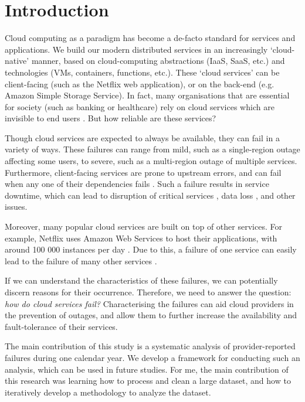 \section{Introduction}
Cloud computing as a paradigm has become a de-facto standard for services and applications.
We build our modern distributed services in an increasingly `cloud-native' manner, based on cloud-computing abstractions (IaaS, SaaS, etc.) and technologies (VMs, containers, functions, etc.).
These `cloud services' can be client-facing (such as the Netflix web application), or on the back-end (e.g. Amazon Simple Storage Service).
In fact, many organisations that are essential for society (such as banking or healthcare) rely on cloud services which are invisible to end users \cite{armbrust2010,dean2015}.
But how reliable are these services?

Though cloud services are expected to always be available, they can fail in a variety of ways.
These failures can range from mild, such as a single-region outage affecting some users, to severe, such as a multi-region outage of multiple services.
Furthermore, client-facing services are prone to upstream errors, and can fail when any one of their dependencies fails \cite{steen2016}.
Such a failure results in service downtime, which can lead to disruption of critical services \cite{emergencyOnCloud,healthcareCrash}, data loss \cite{tencentDataLoss}, and other issues.

Moreover, many popular cloud services are built on top of other services.
For example, Netflix uses Amazon Web Services to host their applications, with around 100 000 instances per day \cite{awsNetflixStudy}.
Due to this, a failure of one service can easily lead to the failure of many other services \cite{whittaker2013,azureXboxOutage2013,azureXboxOutage2014}.

If we can understand the characteristics of these failures, we can potentially discern reasons for their occurrence.
Therefore, we need to answer the question: \textit{how do cloud services fail?}
Characterising the failures can aid cloud providers in the prevention of outages, and allow them to further increase the availability and fault-tolerance of their services.

The main contribution of this study is a systematic analysis of provider-reported failures during one calendar year.
We develop a framework for conducting such an analysis, which can be used in future studies.
For me, the main contribution of this research was learning how to process and clean a large dataset, and how to iteratively develop a methodology to analyze the dataset.
